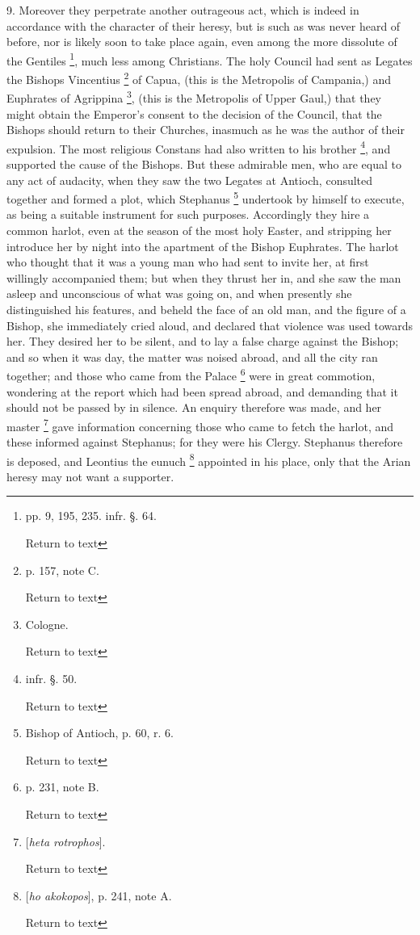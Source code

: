 9. Moreover they perpetrate another outrageous
act, which is indeed in accordance with the character of their heresy,
but is such as was never heard of before, nor is likely soon to take
place again, even among the more dissolute of the Gentiles \footnote{pp. 9, 195, 235. infr. §. 64.

Return to text}, much less among Christians. The holy Council had sent as
Legates the Bishops Vincentius \footnote{p. 157, note C.

Return to text} of Capua, (this is the Metropolis of Campania,) and Euphrates
of Agrippina \footnote{Cologne.

Return to text}, (this
is the Metropolis of Upper Gaul,) that they might obtain the Emperor's
consent to the decision of the Council, that the Bishops should return
to their Churches, inasmuch as he was the author of their expulsion.
The most religious Constans had also written to his brother \footnote{infr. §. 50.

Return to text}, and supported the cause of the Bishops. But these admirable
men, who are equal to any act of audacity, when they saw the two
Legates at Antioch, consulted together and formed a plot, which
Stephanus \footnote{Bishop of Antioch, p. 60, r. 6.

Return to text} undertook
by himself to execute, as being a suitable instrument for such
purposes. Accordingly they hire a common harlot, even at the season of
the most holy Easter, and stripping her introduce her by night into
the apartment of the Bishop Euphrates. The harlot who thought that it
was a young man who had sent to invite her, at first willingly
accompanied them; but when they thrust her in, and she saw the man
asleep and unconscious of what was going on, and when presently she
distinguished his features, and beheld the face of an old man, and the
figure of a Bishop, she immediately cried aloud, and declared that
violence was used towards her. They desired her to be silent,
and to lay a false charge against the Bishop; and so when it was day,
the matter was noised abroad, and all the city ran together; and those
who came from the Palace \footnote{p. 231, note B.

Return to text}
were in great commotion, wondering at the report which had been spread
abroad, and demanding that it should not be passed by in silence. An
enquiry therefore was made, and her master \footnote{[\emph{heta rotrophos}].

Return to text} gave information concerning those who came to fetch the
harlot, and these informed against Stephanus; for they were his
Clergy. Stephanus therefore is deposed, and Leontius the eunuch \footnote{[\emph{ho akokopos}], p. 241, note A.

Return to text} appointed in his place, only that the Arian heresy may not
want a supporter.

